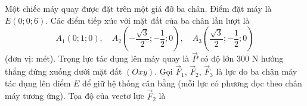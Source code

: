 \begin{ex}
Một chiếc máy quay được đặt trên một giá đỡ ba chân. Điểm đặt máy là $E(0;0;6)$. Các điểm tiếp xúc với mặt đất của ba chân lần lượt là
\[A_1(0;1;0),\quad A_2\left(-\dfrac{\sqrt3}2;-\dfrac12;0\right),\quad A_3\left(\dfrac{\sqrt3}2;-\dfrac12;0\right)\]
(đơn vị: mét). Trọng lực tác dụng lên máy quay là $\vec P$ có độ lớn $300$ N hướng thẳng đứng xuống dưới mặt đất $(Oxy)$. Gọi $\vec F_1$, $\vec F_2$, $\vec F_3$ là lực do ba chân máy tác dụng lên điểm $E$ để giữ hệ thống cân bằng (mỗi lực có phương dọc theo chân máy tương ứng).
Tọa độ của vectơ lực $\vec F_2$ là
\end{ex}
